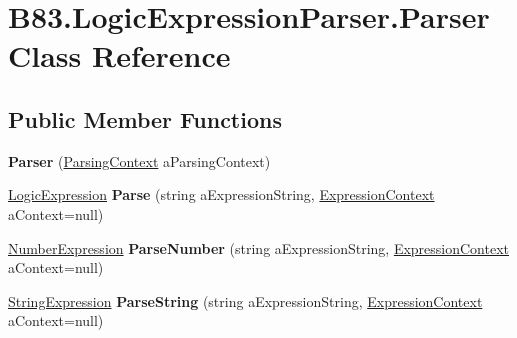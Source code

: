 \hypertarget{class_b83_1_1_logic_expression_parser_1_1_parser}{}\section{B83.\+Logic\+Expression\+Parser.\+Parser Class Reference}
\label{class_b83_1_1_logic_expression_parser_1_1_parser}
\subsection*{Public Member Functions}
\begin{DoxyCompactItemize}
\item 
{\bfseries Parser} (\hyperlink{class_b83_1_1_logic_expression_parser_1_1_parsing_context}{Parsing\+Context} a\+Parsing\+Context)\hypertarget{class_b83_1_1_logic_expression_parser_1_1_parser_a549df2c6409977d5fa6dc5243cc9b38d}{}\label{class_b83_1_1_logic_expression_parser_1_1_parser_a549df2c6409977d5fa6dc5243cc9b38d}

\item 
\hyperlink{class_b83_1_1_logic_expression_parser_1_1_logic_expression}{Logic\+Expression} {\bfseries Parse} (string a\+Expression\+String, \hyperlink{class_b83_1_1_logic_expression_parser_1_1_expression_context}{Expression\+Context} a\+Context=null)\hypertarget{class_b83_1_1_logic_expression_parser_1_1_parser_a94b19733124ebe19cfa8232f1659e582}{}\label{class_b83_1_1_logic_expression_parser_1_1_parser_a94b19733124ebe19cfa8232f1659e582}

\item 
\hyperlink{class_b83_1_1_logic_expression_parser_1_1_number_expression}{Number\+Expression} {\bfseries Parse\+Number} (string a\+Expression\+String, \hyperlink{class_b83_1_1_logic_expression_parser_1_1_expression_context}{Expression\+Context} a\+Context=null)\hypertarget{class_b83_1_1_logic_expression_parser_1_1_parser_a998f99abc4bc48fe4cbd6e28f65086c6}{}\label{class_b83_1_1_logic_expression_parser_1_1_parser_a998f99abc4bc48fe4cbd6e28f65086c6}

\item 
\hyperlink{class_b83_1_1_logic_expression_parser_1_1_string_expression}{String\+Expression} {\bfseries Parse\+String} (string a\+Expression\+String, \hyperlink{class_b83_1_1_logic_expression_parser_1_1_expression_context}{Expression\+Context} a\+Context=null)\hypertarget{class_b83_1_1_logic_expression_parser_1_1_parser_a9fab5c46da62d317b6ba1c6d13ba634e}{}\label{class_b83_1_1_logic_expression_parser_1_1_parser_a9fab5c46da62d317b6ba1c6d13ba634e}

\end{DoxyCompactItemize}
